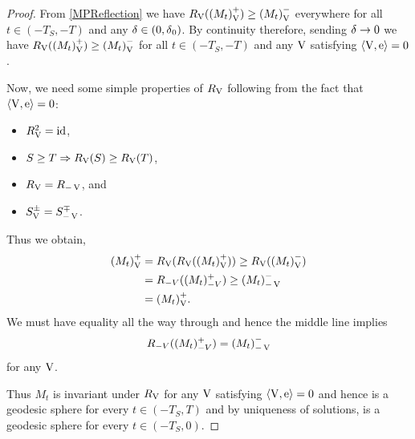 \documentclass{amsart}
\begin{document}
\begin{proof}
From \cref{MPReflection} we have \(\reflectionmap(\reflectionset{(M_t)}^+) \geq \reflectionset{(M_t)}^-\) everywhere for all \(t \in (-T_S, -T)\) and any \(\reflectionangle \in (0,\reflectionangle_0)\). By continuity therefore, sending \(\reflectionangle \to 0\) we have \(\reflectionmap(\reflectionset{(M_t)}^+) \geq \reflectionset{(M_t)}^-\) for all \(t \in (-T_S, -T)\)  and any \(\reflectionvector\) satisfying \(\ip{\reflectionvector}{\vertvec} = 0\).

Now, we need some simple properties of $\reflectionmap[\reflectionvector]$ following from the fact that $\ip{\reflectionvector}{\vertvec} = 0$:
\begin{itemize}
\item $\reflectionmap^2 = \id$,
\item $S \geq T \Rightarrow \reflectionmap(S) \geq  \reflectionmap(T)$,
\item $\reflectionmap = \reflectionmap[-\reflectionvector]$, and
\item $\reflectionset{S}^{\pm} = \reflectionset[-\reflectionvector]{S}^{\mp}$.
\end{itemize}
Thus we obtain,
\begin{align*}
\reflectionset{(M_t)}^+ &= \reflectionmap(\reflectionmap(\reflectionset{(M_t)}^+)) \geq \reflectionmap(\reflectionset{(M_t)}^-) \\
&= R_{-V}((M_t)^+_{-V}) \geq \reflectionset[-\reflectionvector]{(M_t)}^-\\
&= \reflectionset{(M_t)}^+.
\end{align*}
We must have equality all the way through and hence the middle line implies
\[
R_{-V}((M_t)^+_{-V}) = \reflectionset[-\reflectionvector]{(M_t)}^-
\]
for any $\reflectionvector$.

Thus \(M_t\) is invariant under \(\reflectionmap\) for any \(\reflectionvector\) satisfying \(\ip{\reflectionvector}{\vertvec} = 0\) and hence is a geodesic sphere for every \(t \in (-T_S, T)\) and by uniqueness of solutions, is a geodesic sphere for every \(t \in (-T_S, 0)\).
\end{proof}



\end{document}
